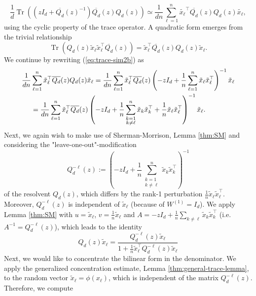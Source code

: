 \documentclass{article}
\begin{document}
\begin{equation}
\frac{1}{d}\operatorname{Tr}\left((zI_{d}+\overline{Q_{d}}(z)^{-1})\overline{Q_{d}}(z)Q_{d}(z)\right)\simeq \frac{1}{dn}\sum_{\ell=1}^n \tilde{x_\ell}^\top\overline{Q_{d}}(z)Q_{d}(z)\tilde{x_\ell},\label{eq:trace-sim2b}
\end{equation}
using the cyclic property of the trace operator. A quadratic form emerges from the trivial relationship
\begin{equation}
\operatorname{Tr}(Q_d(z)\tilde{x}_\ell \tilde{x}_\ell^\top\overline{Q_d}(z)) = \tilde{x}_\ell^\top\overline{Q_d}(z)Q_d(z)\tilde{x}_\ell.
\end{equation}
We continue by rewriting (\ref{eq:trace-sim2b}) as
\begin{align}
\frac{1}{dn}&\sum_{\ell=1}^n \tilde{x}_\ell^\top\overline{Q_{d}}(z)Q_{d}(z)\tilde{x}_\ell = \frac{1}{dn}\sum_{\ell=1}^n \tilde{x}_\ell^\top\overline{Q_{d}}(z)\left(-zI_{d}+\frac{1}{n}\sum_{\ell=1}^n \tilde{x}_\ell \tilde{x}_\ell^\top\right)^{-1}\tilde{x}_\ell \notag
\\&= \frac{1}{dn}\sum_{\ell=1}^n \tilde{x}_\ell^\top\overline{Q_{d}}(z)\left(-zI_{d}+\frac{1}{n}\sum_{\substack{k=1 \\ k\neq\ell}}^n \tilde{x}_k\tilde{x}_k^\top+\frac{1}{n} \tilde{x}_\ell \tilde{x}_\ell^\top\right)^{-1}\tilde{x}_\ell.
\end{align}
Next, we again wish to make use of Sherman-Morrison, Lemma \ref{thm:SM} and considering the "leave-one-out"-modification
\begin{equation}
Q_{d}^{-\ell}(z):=\left(-zI_{d} + \frac{1}{n}\sum_{\substack{k=1 \\ k\neq\ell}}^n \tilde{x}_k\tilde{x}_k^\top\right)^{-1}
\end{equation}
of the resolvent $Q_{d}(z)$, which differs by the rank-1 perturbation $\frac{1}{n}\tilde{x}_\ell \tilde{x}_\ell^\top$. Moreover, $Q_{d}^{-\ell}(z)$ is independent of $\tilde{x}_\ell$ (because of $W^{(1)}=I_d$). We apply Lemma \ref{thm:SM} with $u=\tilde{x}_\ell$, $v=\frac{1}{n}\tilde{x}_\ell$ and $A=-zI_{d}+\frac{1}{n}\sum\limits_{k\neq\ell}\tilde{x}_k\tilde{x}_k^\top$ (i.e. $A^{-1}=Q_{d}^{-\ell}(z)$), which leads to the identity
\begin{equation}
Q_{d}(z)\tilde{x}_\ell = \frac{Q_{d}^{-\ell}(z)\tilde{x}_\ell}{1+\frac{1}{n}\tilde{x}_\ell^\top Q_{d}^{-\ell}(z)\tilde{x}_\ell}
\end{equation}
Next, we would like to concentrate the bilinear form in the denominator. We apply the generalized concentration estimate, Lemma \ref{thm:general-trace-lemma}, to the random vector $\tilde{x}_\ell=\phi(x_\ell)$, which is independent of the matrix $Q_{d}^{-\ell}(z)$. Therefore, we compute
\end{document}
